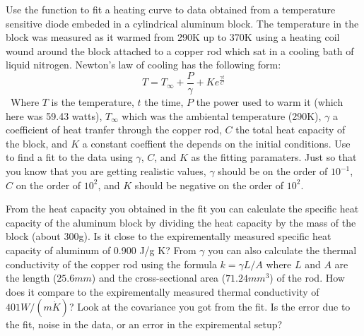 \begin{problem}
Use the  function to fit a heating curve to data obtained from a temperature sensitive diode embeded in a cylindrical aluminum block. The temperature in the block was measured as it warmed from 290K up to 370K using a heating coil wound around the block attached to a copper rod which sat in a cooling bath of liquid nitrogen. 
Newton's law of cooling has the following form:
\[
T = T_{\infty} + \frac{P}{\gamma}+Ke^{\frac{\gamma t}{C}}
\]\
Where $T$ is the temperature, $t$ the time, $P$ the power used to warm it (which here was 59.43 watts), $T_{\infty}$ which was the ambiental temperature (290K), $\gamma$ a coefficient of heat tranfer through the copper rod, $C$ the total heat capacity of the block, and $K$ a constant coeffient the depends on the initial conditions. Use  to find a fit to the data using $\gamma$, $C$, and $K$ as the fitting paramaters. Just so that you know that you are getting realistic values, $\gamma$ should be on the order of $10^{-1}$, $C$ on the order of $10^{2}$, and $K$ should be negative on the order of $10^{2}$.

From the heat capacity you obtained in the fit you can calculate the specific heat capacity of the aluminum block by dividing the heat capacity by the mass of the block (about 300g). Is it close to the expirementally measured specific heat capacity of aluminum of 0.900 J/g K? From $\gamma$ you can also calculate the thermal conductivity of the copper rod using the formula $k=\gamma L/A$ where $L$ and $A$ are the length ($25.6mm$) and the cross-sectional area ($71.24mm^{3}$) of the rod. How does it compare to the expirementally measured thermal conductivity of $401 W/(m \dot K)$? Look at the covariance you got from the fit. Is the error due to the fit, noise in the data, or an error in the expiremental setup?
\end{problem}

